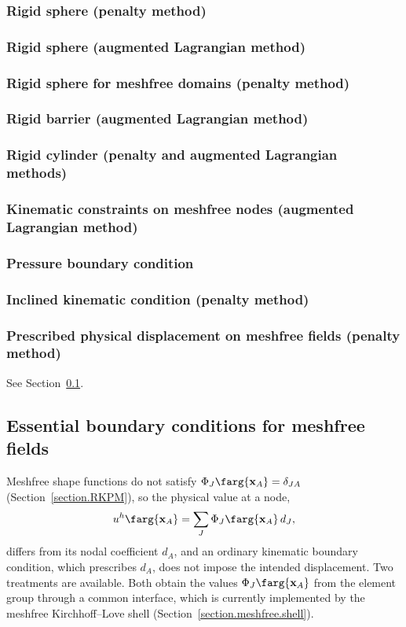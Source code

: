 \subsubsection{Rigid sphere (penalty method)}
\subsubsection{Rigid sphere (augmented Lagrangian method)}
\subsubsection{Rigid sphere for meshfree domains (penalty method)}
\subsubsection{Rigid barrier (augmented Lagrangian method)}
\subsubsection{Rigid cylinder (penalty and augmented Lagrangian methods)}
\subsubsection{Kinematic constraints on meshfree nodes (augmented Lagrangian method)}
\subsubsection{Pressure boundary condition}
\subsubsection{Inclined kinematic condition (penalty method)}
\subsubsection{Prescribed physical displacement on meshfree fields (penalty method)}
See Section~\ref{set.ICandBC.meshfree.EBC}.

\subsection{Essential boundary conditions for meshfree fields}
\label{set.ICandBC.meshfree.EBC}
Meshfree shape functions do not satisfy $\Phi_{J}\farg{\mathbf{x}_{A}}=\delta_{JA}$
(Section~\ref{section.RKPM}), so the physical value at a node,
\begin{equation}
\label{eq.meshfree.EBC.value}
u^{h}\farg{\mathbf{x}_{A}} = \sum_{J} \Phi_{J}\farg{\mathbf{x}_{A}}\, d_{J},
\end{equation}
differs from its nodal coefficient $d_{A}$, and an ordinary kinematic boundary condition, which
prescribes $d_{A}$, does not impose the intended displacement. Two treatments are available. Both
obtain the values $\Phi_{J}\farg{\mathbf{x}_{A}}$ from the element group through a common
interface, which is currently implemented by the meshfree Kirchhoff--Love shell
(Section~\ref{section.meshfree.shell}).

